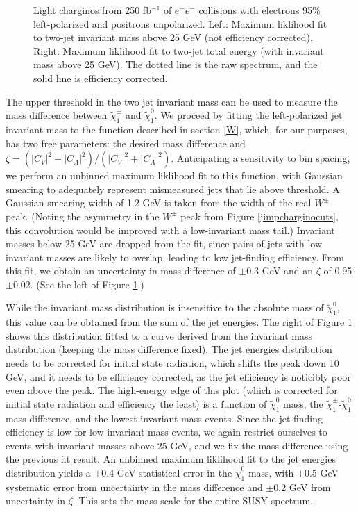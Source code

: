 \documentclass[12pt]{article}
\begin{document}
\begin{figure}[t]
\begin{center}
\begin{tabular}{p{0.49\linewidth} p{0.49\linewidth}}
    \end{tabular}
    \caption{Light charginos from 250 fb$^{-1}$ of $e^+e^-$ collisions
    with electrons 95\% left-polarized and positrons unpolarized.
    Left: Maximum liklihood fit to two-jet invariant mass above 25 GeV
    (not efficiency corrected).  Right: Maximum liklihood fit to
    two-jet total energy (with invariant mass above 25 GeV).  The
    dotted line is the raw spectrum, and the solid line is efficiency
    corrected.}
    \label{jimpcharginoanal}
  \end{center}
\end{figure}

The upper threshold in the two jet invariant mass can be used to
measure the mass difference between $\tilde{\chi}^\pm_1$ and
$\tilde{\chi}^0_1$.  We proceed by fitting the left-polarized jet
invariant mass to the function described in section \ref{W}, which,
for our purposes, has two free parameters: the desired mass difference
and $\zeta = (|C_V|^2 - |C_A|^2)/(|C_V|^2 + |C_A|^2)$.  Anticipating a
sensitivity to bin spacing, we perform an unbinned maximum liklihood
fit to this function, with Gaussian smearing to adequately represent
mismeasured jets that lie above threshold.  A Gaussian smearing width
of 1.2 GeV is taken from the width of the real $W^\pm$ peak.  (Noting
the asymmetry in the $W^\pm$ peak from Figure \ref{jimpcharginocuts},
this convolution would be improved with a low-invariant mass tail.)
Invariant masses below 25 GeV are dropped from the fit, since pairs of
jets with low invariant masses are likely to overlap, leading to low
jet-finding efficiency.  From this fit, we obtain an uncertainty in
mass difference of $\pm$0.3 GeV and an $\zeta$ of 0.95 $\pm$0.02.
(See the left of Figure \ref{jimpcharginoanal}.)

While the invariant mass distribution is insensitive to the absolute
mass of $\tilde{\chi}^0_1$, this value can be obtained from the sum of
the jet energies.  The right of Figure \ref{jimpcharginoanal} shows
this distribution fitted to a curve derived from the invariant mass
distribution (keeping the mass difference fixed).  The jet energies
distribution needs to be corrected for initial state radiation, which
shifts the peak down 10 GeV, and it needs to be efficiency corrected,
as the jet efficiency is noticibly poor even above the peak.  The
high-energy edge of this plot (which is corrected for initial state
radiation and efficiency the least) is a function of
$\tilde{\chi}^0_1$ mass, the $\tilde{\chi}^\pm_1$-$\tilde{\chi}^0_1$
mass difference, and the lowest invariant mass events.  Since the
jet-finding efficiency is low for low invariant mass events, we again
restrict ourselves to events with invariant masses above 25 GeV, and
we fix the mass difference using the previous fit result.  An unbinned
maximum liklihood fit to the jet energies distribution yields a
$\pm$0.4 GeV statistical error in the $\tilde{\chi}^0_1$ mass, with
$\pm$0.5 GeV systematic error from uncertainty in the mass difference
and $\pm$0.2 GeV from uncertainty in $\zeta$.  This sets the mass
scale for the entire SUSY spectrum.
\end{document}
